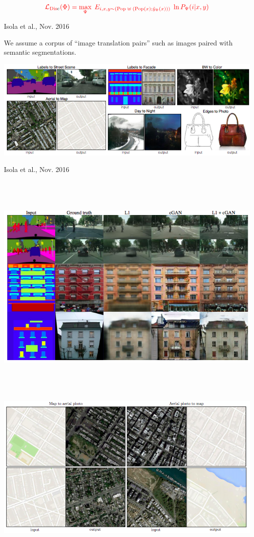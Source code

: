 {$${\color{red}  {\cal L}_{\mathrm{Dis{\color{black}c}}}(\Phi) = \max_\Psi \;E_{i,x,y \sim (\mathrm{Pop}\; \uplus \;(\mathrm{Pop}(x);\hat{y}_\Phi(x)))}\;\ln P_\Psi(i|x,y)}$$

{Isola et al., Nov. 2016}

We assume a corpus of ``image translation pairs'' such as images paired with semantic segmentations.

\centerline{\includegraphics[width = 8.0in]{../images/cGAN0}}

{Isola et al., Nov. 2016}

\centerline{\includegraphics[height = 4.5in]{../images/cGAN1}}


\centerline{\includegraphics[width = 8.0in]{../images/cGAN2}}

}
